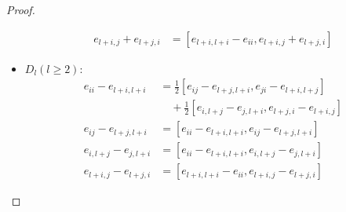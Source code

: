 \begin{proof}
\begin{itemize}
\begin{align*}
      e_{l+i,j} + e_{l+j,i} &= [e_{l+i,l+i} - e_{ii}, e_{l+i,j} + e_{l+j,i}]
    \end{align*}
    \item $D_l(l\geqslant2)$:
    \begin{align*}
      e_{ii} - e_{l+i,l+i} &= \frac{1}{2} [e_{ij} - e_{l+j,l+i}, e_{ji} - e_{l+i,l+j}] \\
      & \quad+ \frac{1}{2} [e_{i,l+j} - e_{j,l+i}, e_{l+j,i} - e_{l+i,j} ] \\
      e_{ij} - e_{l+j,l+i} &= [e_{ii} - e_{l+i,l+i}, e_{ij} - e_{l+j,l+i}] \\
      e_{i,l+j} - e_{j,l+i} &= [e_{ii} - e_{l+i,l+i}, e_{i,l+j} - e_{j,l+i}] \\
      e_{l+i,j} - e_{l+j,i} & = [e_{l+i,l+i} - e_{ii}, e_{l+i,j} - e_{l+j,i}]
    \end{align*}
  \end{itemize}
\end{proof}

